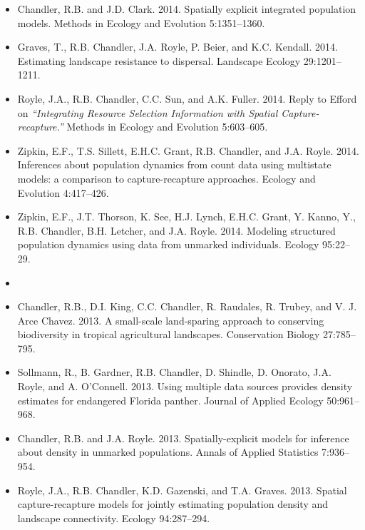 \begin{itemize}
\item Chandler, R.B. and J.D. Clark. 2014. Spatially
  explicit integrated population models. Methods in Ecology and
  Evolution 5:1351--1360.

\item Graves, T., R.B. Chandler, J.A. Royle, P. Beier, and
  K.C. Kendall. 2014. Estimating landscape resistance to
  dispersal. Landscape Ecology 29:1201--1211.

\item Royle, J.A., R.B. Chandler, C.C. Sun, and A.K. Fuller. 2014. 
  Reply to Efford on   {\it ``Integrating Resource Selection
    Information with Spatial Capture-recapture.''} Methods in Ecology
  and Evolution 5:603--605. 

\item Zipkin, E.F., T.S. Sillett, E.H.C. Grant, R.B. Chandler, and
  J.A. Royle. 2014. Inferences about population dynamics
  from count data using multistate models: a comparison to
  capture-recapture approaches. Ecology and Evolution 4:417--426.

\item Zipkin, E.F., J.T. Thorson, K. See, H.J. Lynch, E.H.C. Grant,
  Y. Kanno, Y., R.B. Chandler, B.H. Letcher, and J.A. Royle.
  2014. Modeling structured population dynamics using
  data from unmarked individuals. Ecology 95:22--29.


\item[] { \\}

\item Chandler, R.B., D.I. King, C.C. Chandler, R. Raudales,
  R. Trubey, and V. J. Arce Chavez. 2013. A small-scale
  land-sparing approach to conserving biodiversity in tropical
  agricultural landscapes. Conservation Biology 27:785--795. 

\item Sollmann, R., B. Gardner, R.B. Chandler, D. Shindle,
  D. Onorato, J.A. Royle, and A. O'Connell. 2013.
  Using multiple data sources provides density estimates for
  endangered Florida panther. Journal of Applied Ecology 50:961--968.

\item Chandler, R.B. and J.A. Royle. 2013.
  Spatially-explicit models for inference about density in unmarked
  populations. Annals of Applied Statistics 7:936--954.

\item Royle, J.A., R.B. Chandler, K.D. Gazenski, and
  T.A. Graves. 2013. Spatial capture-recapture models for jointly
  estimating population density and landscape connectivity. Ecology
  94:287--294. 


\end{itemize}
